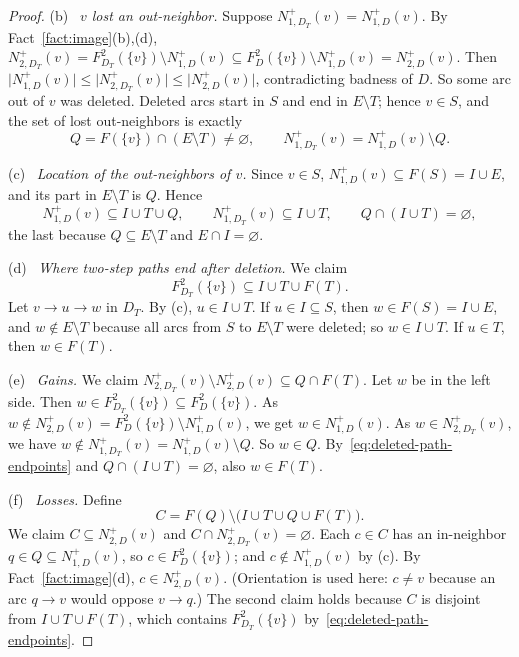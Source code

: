 \documentclass[11pt]{article}
\theoremstyle{remark}
\newcommand{\abs}[1]{\lvert #1\rvert}
\newcommand{\substep}[1]{\par\smallskip\noindent\textup{(#1)}\ }
\begin{document}
\begin{proof}
\substep{b} \emph{$v$ lost an out-neighbor.}
Suppose $N_{1,D_T}^+(v)=N_{1,D}^+(v)$. By Fact~\ref{fact:image}(b),(d),
$N_{2,D_T}^+(v)=F_{D_T}^2(\{v\})\setminus N_{1,D}^+(v)\subseteq
F_{D}^2(\{v\})\setminus N_{1,D}^+(v)=N_{2,D}^+(v)$. Then
$\abs{N_{1,D}^+(v)}\le\abs{N_{2,D_T}^+(v)}\le\abs{N_{2,D}^+(v)}$,
contradicting badness of $D$. So some arc out of $v$ was deleted. Deleted arcs
start in $S$ and end in $E\setminus T$; hence $v\in S$, and the set of lost
out-neighbors is exactly
\[
  Q=F(\{v\})\cap(E\setminus T)\neq\varnothing,\qquad
  N_{1,D_T}^+(v)=N_{1,D}^+(v)\setminus Q .
\]

\substep{c} \emph{Location of the out-neighbors of $v$.}
Since $v\in S$, $N_{1,D}^+(v)\subseteq F(S)=I\cup E$, and its part in
$E\setminus T$ is $Q$. Hence
\[
 N_{1,D}^+(v)\subseteq I\cup T\cup Q,\qquad
 N_{1,D_T}^+(v)\subseteq I\cup T,\qquad
 Q\cap(I\cup T)=\varnothing ,
\]
the last because $Q\subseteq E\setminus T$ and $E\cap I=\varnothing$.

\substep{d} \emph{Where two-step paths end after deletion.} We claim
\begin{equation}
\label{eq:deleted-path-endpoints}
  F_{D_T}^2(\{v\})\subseteq I\cup T\cup F(T).
\end{equation}
Let $v\to u\to w$ in $D_T$. By (c), $u\in I\cup T$. If $u\in I\subseteq S$,
then $w\in F(S)=I\cup E$, and $w\notin E\setminus T$ because all arcs from $S$
to $E\setminus T$ were deleted; so $w\in I\cup T$. If $u\in T$, then
$w\in F(T)$.

\substep{e} \emph{Gains.}
We claim $N_{2,D_T}^+(v)\setminus N_{2,D}^+(v)\subseteq Q\cap F(T)$. Let $w$
be in the left side. Then $w\in F_{D_T}^2(\{v\})\subseteq F_D^2(\{v\})$. As
$w\notin N_{2,D}^+(v)=F_D^2(\{v\})\setminus N_{1,D}^+(v)$, we get
$w\in N_{1,D}^+(v)$. As $w\in N_{2,D_T}^+(v)$, we have
$w\notin N_{1,D_T}^+(v)=N_{1,D}^+(v)\setminus Q$. So $w\in Q$.
By~\eqref{eq:deleted-path-endpoints} and $Q\cap(I\cup T)=\varnothing$, also
$w\in F(T)$.

\substep{f} \emph{Losses.} Define
\[
  C=F(Q)\setminus\bigl(I\cup T\cup Q\cup F(T)\bigr).
\]
We claim $C\subseteq N_{2,D}^+(v)$ and $C\cap N_{2,D_T}^+(v)=\varnothing$.
Each $c\in C$ has an in-neighbor $q\in Q\subseteq N_{1,D}^+(v)$, so
$c\in F_D^2(\{v\})$; and $c\notin N_{1,D}^+(v)$ by (c). By
Fact~\ref{fact:image}(d), $c\in N_{2,D}^+(v)$. (Orientation is used here:
$c\neq v$ because an arc $q\to v$ would oppose $v\to q$.) The second claim
holds because $C$ is disjoint from $I\cup T\cup F(T)$, which contains
$F_{D_T}^2(\{v\})$ by~\eqref{eq:deleted-path-endpoints}.


\end{proof}
\end{document}
